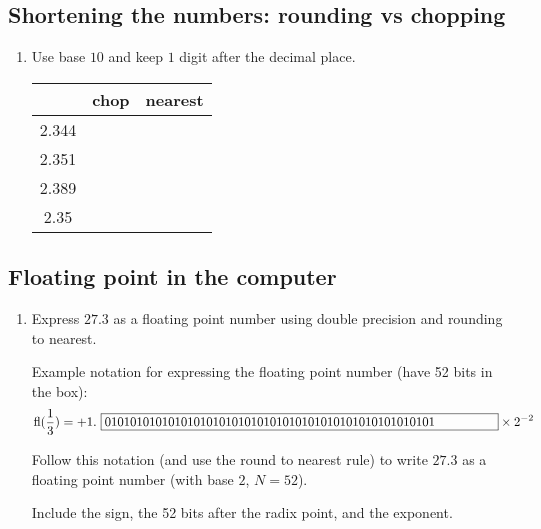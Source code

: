 \documentclass[12pt,letterpaper,noanswers]{exam}
\begin{document}
\vspace{1in}

\subsection{Shortening the numbers: rounding vs chopping}

\begin{enumerate}[resume]
\item Use base $10$ and keep $1$ digit after the decimal place.

\begin{tabular}{c|c|c}
     & chop & nearest \\
     \hline
  2.344   & & \\
2.351 & & \\
2.389 & & \\
2.35 & & \\
\end{tabular}
\end{enumerate}

\subsection{Floating point in the computer}

\begin{enumerate}[resume]
\item Express $27.3$ as a floating point number using double precision and rounding to nearest.
    
     Example notation for expressing the floating point number (have 52 bits in the box):
\[\text{fl}(\frac{1}{3}) = +1.\ \framebox[11cm][l]{0101010101010101010101010101010101010101010101010101}\times 2^{-2}\]

Follow this notation (and use the round to nearest rule) to write $27.3$ as a floating point number (with base $2$, $N = 52$).

Include the sign, the 52 bits after the radix point, and the exponent.

\end{enumerate}
\end{document}
